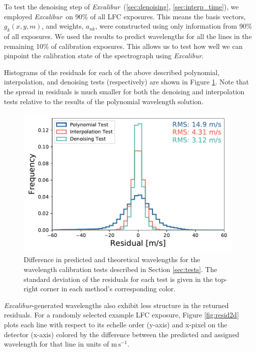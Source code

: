\documentclass[modern]{aastex63}
\newcommand{\project}[1]{\textsl{#1}}
\newcommand{\name}{\project{Excalibur}}
\newcommand{\mps}{\mathrm{m\,s^{-1}}}
\begin{document}
To test the denoising step of \name\ (\textsection \ref{sec:denoising}, \textsection\ref{sec:interp_time}), we employed \name\ on 90\% of all LFC exposures.  This means the basis vectors, $g_k(x,y,m)$,  and weights, $a_{nk}$, were constructed using only information from 90\% of all exposures.  We used the results to predict wavelengths for all the lines in the remaining 10\% of calibration exposures.  This allows us to test how well we can pinpoint the calibration state of the spectrograph using \name.

Histograms of the residuals for each of the above described polynomial, interpolation, and denoising tests (respectively) are shown in Figure \ref{fig:testHists}.  Note that the spread in residuals is much smaller for both the denoising and interpolation tests relative to the results of the polynomial wavelength solution.

\begin{figure}[h]
\centering
\includegraphics[width=.5\textwidth]{Figures/all_results.pdf}
\caption{Difference in predicted and theoretical wavelengths for the wavelength calibration tests described in Section \ref{sec:tests}.  The standard deviation of the residuals for each test is given in the top-right corner in each method's corresponding color.}
\label{fig:testHists}
\end{figure} 

\name -generated wavelengths also exhibit less structure in the returned residuals.  For a randomly selected example LFC exposure, Figure \ref{fig:resid2d} plots each line with respect to its echelle order (y-axis) and x-pixel on the detector (x-axis) colored by the difference between the predicted and assigned wavelength for that line in units of $\mps$.
\end{document}
